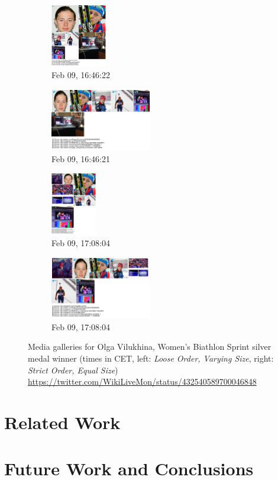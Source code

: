\documentclass{sig-alternate}
\newcommand{\inlinelistingsize}{\fontsize{8pt}{11pt}}
\let\oldurl\url
\renewcommand{\url}[1]{\inlinelistingsize\oldurl{#1}}
\begin{document}
\begin{figure}
\begin{subfigure}[t]{0.25\textwidth}
    \includegraphics[height=2.75cm]{figures/olga_vilukhina/mediagallery_looseOrder_1391960782060.png}
    \caption{Feb 09, 16:46:22}
    \label{fig:1391960782060}
  \end{subfigure}%
  \begin{subfigure}[t]{0.25\textwidth}
    \includegraphics[height=2.75cm]{figures/olga_vilukhina/mediagallery_strictOrder_1391960781898.png}
    \caption{Feb 09, 16:46:21}
    \label{fig:1391960781898}
  \end{subfigure}
  \begin{subfigure}[t]{0.25\textwidth}
    \includegraphics[height=2.75cm]{figures/olga_vilukhina/mediagallery_looseOrder_1391962084554.png}
    \caption{Feb 09, 17:08:04}
    \label{fig:1391962084554}
  \end{subfigure}%
  \begin{subfigure}[t]{0.25\textwidth}
    \includegraphics[height=2.75cm]{figures/olga_vilukhina/mediagallery_strictOrder_1391962084361.png}
    \caption{Feb 09, 17:08:04}
    \label{fig:1391962084361}
  \end{subfigure}  
  \caption{Media galleries for Olga Vilukhina,
    Women's Biathlon Sprint silver medal winner
    (times in CET, left: \emph{Loose Order, Varying Size},
    right: \emph{Strict Order, Equal Size})
    \url{https://twitter.com/WikiLiveMon/status/432540589700046848}}
  \label{fig:olga-vilukhina}
\end{figure}

\section{Related Work}
\label{sec:related-work}
\selectfont

\section{Future Work and Conclusions}
\label{sec:future-work-and-conclusions}
\selectfont



\balancecolumns
\end{document}
